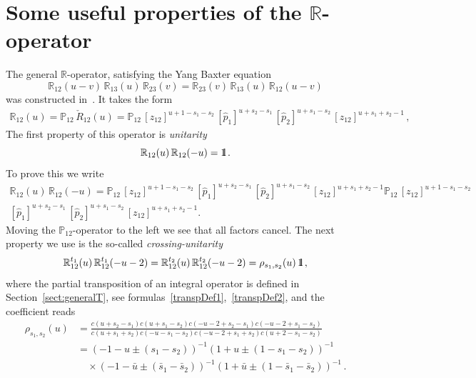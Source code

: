 \documentclass[a4paper,11pt]{article}
\def\II{\hbox{{1}\kern-.25em\hbox{l}}}
\numberwithin{equation}{section}
\begin{document}
\section{Some useful properties of the $\mathbb{R}$-operator} 
\label{app:ucu}
The general $\mathbb{R}$-operator, satisfying the Yang Baxter equation
\begin{equation*}
	\mathbb{R}_{12}(u-v)\,\mathbb{R}_{13}(u)\,\mathbb{R}_{23}(v)=\mathbb{R}_{23}(v)\,\mathbb{R}_{13}(u)\,\mathbb{R}_{12}(u-v)
\end{equation*}
was constructed in~\cite{DM09}. It takes the form 
\begin{align*}
	\mathbb{R}_{12}(u) = \mathbb{P}_{12}\,\check{R}_{12}(u) = \mathbb{P}_{12}\,
	[z_{12}]^{u+1-s_1-s_2}\,
	[\hat{p}_1]^{u+s_2-s_1}\,[\hat{p}_2]^{u+s_1-s_2}\,
	[z_{12}]^{u+s_1+s_2-1} \,,
\end{align*}	
The first property of this operator is \textit{unitarity}
\begin{equation}\nonumber
	\mathbb{R}_{12}(u)\,\mathbb{R}_{12}(-u) = \II \,.
\end{equation}	
To prove this we write
\begin{align*}
	\mathbb{R}_{12}(u)\,\mathbb{R}_{12}(-u) =  \mathbb{P}_{12}\,
	[z_{12}]^{u+1-s_1-s_2}\,
	[\hat{p}_1]^{u+s_2-s_1}\,[\hat{p}_2]^{u+s_1-s_2}\,
	[z_{12}]^{u+s_1+s_2-1} \mathbb{P}_{12}\,
	[z_{12}]^{u+1-s_1-s_2}\\
	[\hat{p}_1]^{u+s_2-s_1}\,[\hat{p}_2]^{u+s_1-s_2}\,
	[z_{12}]^{u+s_1+s_2-1} .
\end{align*}
Moving the $\mathbb{P}_{12}$-operator to the left we see that all factors cancel.
The next property we use is the so-called \textit{crossing-unitarity}
\begin{equation}\label{Rcuni}
	\mathbb{R}_{12}^{t_1}(u)\,\mathbb{R}_{12}^{t_1}(-u-2) =
	\mathbb{R}_{12}^{t_2}(u)\,\mathbb{R}_{12}^{t_2}(-u-2) =
	\rho_{s_1,s_2}(u)\,\II \,,
\end{equation}	
where the partial transposition of an integral operator is defined in Section~\ref{sect:generalT}, see formulas~\eqref{transpDef1},~\eqref{transpDef2}, and the coefficient reads
\begin{align*}
	\rho_{s_1,s_2}(u) & = \frac{c(u+s_2-s_1)c(u+s_1-s_2)c(-u-2+s_2-s_1)c(-u-2+s_1-s_2)}{c(u+s_1+s_2)c(-u-s_1-s_2)c(-u-2+s_1+s_2)c(u+2-s_1-s_2)} \\
	& =
	(-1-u\pm(s_1-s_2))^{-1}(1+u\pm(1-s_1-s_2))^{-1} \\
	& \quad \times
	(-1-\bar{u}\pm(\bar{s}_1-\bar{s}_2))^{-1}(1+\bar{u}\pm(1-\bar{s}_1-\bar{s}_2))^{-1} \,.
\end{align*}
\end{document}
